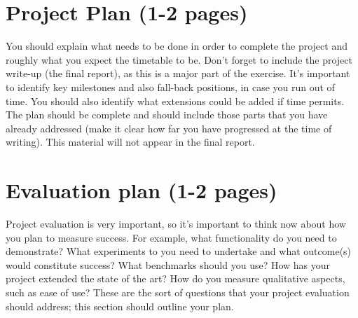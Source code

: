 \documentclass[12pt,twoside]{article}
\begin{document}
\section{Project Plan (1-2 pages)}
You should explain what needs to be done in order to complete the project and roughly what you expect the timetable to be. Don’t forget to include the project write-up (the final report), as this is a major part of the exercise. It’s important to identify key milestones and also fall-back positions, in case you run out of time.  You should also identify what extensions could be added if time permits.  The plan should be complete and should include those parts that you have already addressed (make it clear how far you have progressed at the time of writing).  This material will not appear in the final report.

\section{Evaluation plan (1-2 pages)}
Project evaluation is very important, so it's important to think now about how you plan to measure success. For example, what functionality do you need to demonstrate?  What experiments to you need to undertake and what outcome(s) would constitute success?  What benchmarks should you use? How has your project extended the state of the art?  How do you measure qualitative aspects, such as ease of use?  These are the sort of questions that your project evaluation should address; this section should outline your plan.


\end{document}
